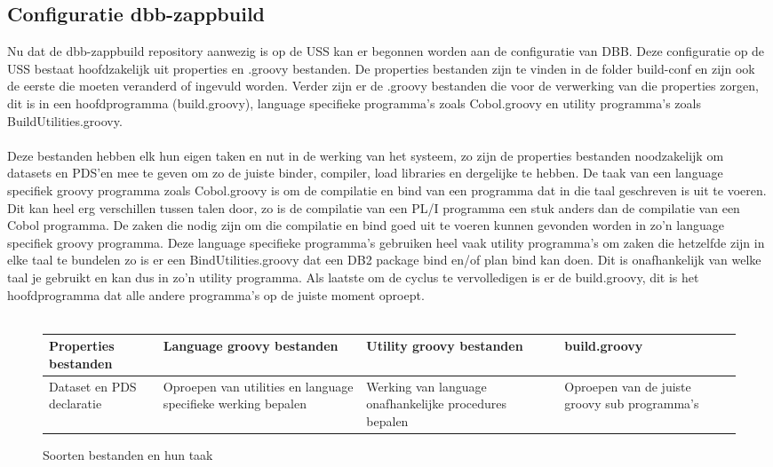 \subsection{Configuratie dbb-zappbuild}
Nu dat de dbb-zappbuild repository aanwezig is op de USS kan er begonnen worden aan de configuratie van DBB. Deze configuratie op de USS bestaat hoofdzakelijk uit properties en .groovy bestanden. De properties bestanden zijn te vinden in de folder build-conf en zijn ook de eerste die moeten veranderd of ingevuld worden. Verder zijn er de .groovy bestanden die voor de verwerking van die properties zorgen, dit is in een hoofdprogramma (build.groovy), language specifieke programma's zoals Cobol.groovy en utility programma's zoals BuildUtilities.groovy.
\\ \\
Deze bestanden hebben elk hun eigen taken en nut in de werking van het systeem, zo zijn de properties bestanden noodzakelijk om datasets en PDS'en mee te geven om zo de juiste binder, compiler, load libraries en dergelijke te hebben. De taak van een language specifiek groovy programma zoals Cobol.groovy is om de compilatie en bind van een programma dat in die taal geschreven is uit te voeren. Dit kan heel erg verschillen tussen talen door, zo is de compilatie van een PL/I programma een stuk anders dan de compilatie van een Cobol programma. De zaken die nodig zijn om die compilatie en bind goed uit te voeren kunnen gevonden worden in zo'n language specifiek groovy programma. Deze language specifieke programma's gebruiken heel vaak utility programma's om zaken die hetzelfde zijn in elke taal te bundelen zo is er een BindUtilities.groovy dat een DB2 package bind en/of plan bind kan doen. Dit is onafhankelijk van welke taal je gebruikt en kan dus in zo'n utility programma. Als laatste om de cyclus te vervolledigen is er de build.groovy, dit is het hoofdprogramma dat alle andere programma's op de juiste moment oproept.
\\ \\
\begin{figure}[h]
\begin{tabularx}{1\textwidth} { 
        | >{\centering\arraybackslash}X 
        | >{\centering\arraybackslash}X 
        | >{\centering\arraybackslash}X 
        | >{\centering\arraybackslash}X  | }
    \hline
    Properties bestanden & 
    Language groovy bestanden & 
    Utility groovy bestanden & 
    build.groovy \\
    \hline
    Dataset en PDS declaratie & 
    Oproepen van utilities en language specifieke werking bepalen & 
    Werking van language onafhankelijke procedures bepalen & 
    Oproepen van de juiste groovy sub programma's \\ 
    \hline
\end{tabularx}
\caption{Soorten bestanden en hun taak}
\label{tab:soorten bestanden}
\end{figure}

